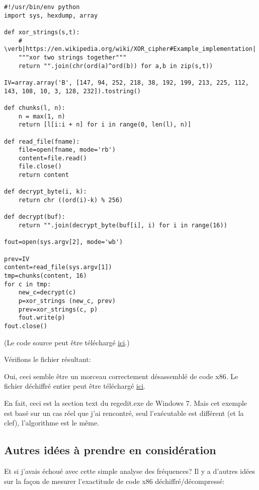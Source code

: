 \begin{lstlisting}[style=custompy]
#!/usr/bin/env python
import sys, hexdump, array

def xor_strings(s,t):
    # \verb|https://en.wikipedia.org/wiki/XOR_cipher#Example_implementation|
    """xor two strings together"""
    return "".join(chr(ord(a)^ord(b)) for a,b in zip(s,t))

IV=array.array('B', [147, 94, 252, 218, 38, 192, 199, 213, 225, 112, 143, 108, 10, 3, 128, 232]).tostring()

def chunks(l, n):
    n = max(1, n)
    return [l[i:i + n] for i in range(0, len(l), n)]

def read_file(fname):
    file=open(fname, mode='rb')
    content=file.read()
    file.close()
    return content

def decrypt_byte(i, k):
    return chr ((ord(i)-k) % 256)

def decrypt(buf):
    return "".join(decrypt_byte(buf[i], i) for i in range(16))

fout=open(sys.argv[2], mode='wb')

prev=IV
content=read_file(sys.argv[1])
tmp=chunks(content, 16)
for c in tmp:
    new_c=decrypt(c)
    p=xor_strings (new_c, prev)
    prev=xor_strings(c, p)
    fout.write(p)
fout.close()
\end{lstlisting}

(Le code source peut être téléchargé
\href{\RepoURL/examples/simple_exec_crypto/files/decrypt2.py}
{ici}.)

Vérifions le fichier résultant:



Oui, ceci semble être un morceau correctement désassemblé de code x86.
Le fichier déchiffré entier peut être téléchargé
\href{\RepoURL/examples/simple_exec_crypto/files/decrypted.bin}{ici}.

En fait, ceci est la section text du regedit.exe de Windows 7.
Mais cet exemple est basé sur un cas réel que j'ai rencontré, seul l'exécutable est
différent (et la clef), l'algorithme est le même.

\subsection{Autres idées à prendre en considération}

Et si j'avais échoué avec cette simple analyse des fréquences?
Il y a d'autres idées sur la façon de mesurer l'exactitude de code x86 déchiffré/décompressé:

